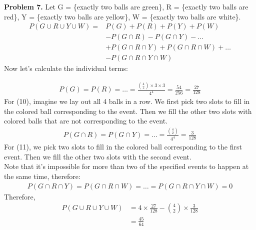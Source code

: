 \documentclass{article}
\begin{document}
\textbf{Problem 7.}
Let G = \{exactly two balls are green\}, R = \{exactly two balls are red\}, Y = \{exactly two balls are yellow\}, W = \{exactly two balls are white\}.
\begin{align}
    P(G \cup R \cup Y \cup W) = & P(G) + P(R) + P(Y) + P(W) \\
    & - P (G \cap R) - P(G \cap Y) -\dots \\
    & + P(G \cap R \cap Y) + P(G \cap R \cap W) + \dots \\
    & - P(G \cap R \cap Y \cap W)
\end{align}
Now let's calculate the individual terms:

\begin{align}
    P(G) = P(R) = \dots = \frac{{4 \choose 2} \times 3 \times 3}{4^4} = \frac{54}{256} = \frac{27}{128}
\end{align}
For (10), imagine we lay out all 4 balls in a row. We first pick two slots to fill in the colored ball corresponding to the event.
Then we fill the other two slots with colored balls that are not corresponding to the event.
\begin{align}
    P(G \cap R) = P(G \cap Y) = \dots = \frac{{4 \choose 2}}{4^4} = \frac{3 }{128}
\end{align}
For (11), we pick two slots to fill in the colored ball corresponding to the first event. Then we fill the other two slots with the second event. \\
Note that it's impossible for more than two of the specified events to happen at the same time, therefore:
\begin{align}
    P(G \cap R \cap Y) = P(G \cap R \cap W) = \dots = P(G \cap R \cap Y \cap W) = 0
\end{align}
Therefore,
\begin{align}
    P(G \cup R \cup Y \cup W) & = 4 \times \frac{27}{128} - {4 \choose 2} \times \frac{3}{128} \\
    & = \frac{45}{64}
\end{align}
\bigbreak
\end{document}
